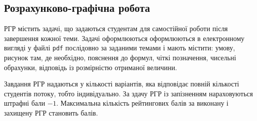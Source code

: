 \documentclass{Syllabus}
\begin{document}
%
%
%


\subsection*{Розрахунково-графічна робота}


РГР містить задачі, що задаються студентам для самостійної роботи після завершення кожної теми. Задачі оформлюються оформлюються в електронному вигляді у файлі \texttt{pdf} послідовно за заданими темами і мають містити: умову, рисунок там, де необхідно, пояснення до формул, чіткі позначення, чисельні обрахунки, відповідь із розмірністю отриманої величини.

Завдання РГР надаються у кількості варіантів, яка відповідає повній кількості студентів потоку, тобто індивідуально. За здачу РГР із запізненням нараховуються штрафні бали $-1$. Максимальна кількість рейтингових балів за виконану і захищену РГР становить \rgrBal{} балів.
\end{document}
